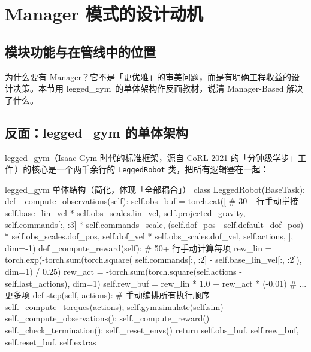 \section{Manager 模式的设计动机}
\label{sec:rlmc-mgr-why}

\subsection{模块功能与在管线中的位置}

为什么要有 Manager？它不是「更优雅」的审美问题，而是有明确工程收益的设计决策。本节用 legged\_gym\,\cite{rudin2021minutes,leggedrobotics2021} 的单体架构作反面教材，说清 Manager-Based 解决了什么。

\subsection{反面：legged\_gym 的单体架构}

legged\_gym（Isaac Gym 时代的标准框架，源自 CoRL 2021 的「分钟级学步」工作\,\cite{rudin2021minutes}）的核心是一个两千余行的 \verb|LeggedRobot| 类，把所有逻辑塞在一起：

\begin{codebox}[Python]{legged\_gym 单体结构（简化，体现「全部耦合」）}
class LeggedRobot(BaseTask):
    def _compute_observations(self):
        self.obs_buf = torch.cat([                 # 30+ 行手动拼接
            self.base_lin_vel * self.obs_scales.lin_vel,
            self.projected_gravity,
            self.commands[:, :3] * self.commands_scale,
            (self.dof_pos - self.default_dof_pos) * self.obs_scales.dof_pos,
            self.dof_vel * self.obs_scales.dof_vel,
            self.actions,
        ], dim=-1)
    def _compute_reward(self):                      # 50+ 行手动计算每项
        rew_lin = torch.exp(-torch.sum(torch.square(
            self.commands[:, :2] - self.base_lin_vel[:, :2]), dim=1) / 0.25)
        rew_act = -torch.sum(torch.square(self.actions - self.last_actions), dim=1)
        self.rew_buf = rew_lin * 1.0 + rew_act * (-0.01)  # ... 更多项
    def step(self, actions):                        # 手动编排所有执行顺序
        self._compute_torques(actions); self.gym.simulate(self.sim)
        self._compute_observations(); self._compute_reward()
        self._check_termination(); self._reset_envs()
        return self.obs_buf, self.rew_buf, self.reset_buf, self.extras
\end{codebox}

